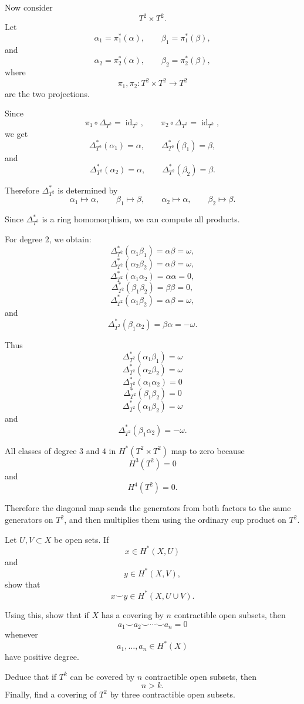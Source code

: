 \begin{solution}
Now consider
\[
T^2\times T^2.
\]
Let
\[
\alpha_1=\pi_1^*(\alpha),
\qquad
\beta_1=\pi_1^*(\beta),
\]
and
\[
\alpha_2=\pi_2^*(\alpha),
\qquad
\beta_2=\pi_2^*(\beta),
\]
where
\[
\pi_1,\pi_2:T^2\times T^2\to T^2
\]
are the two projections.

Since
\[
\pi_1\circ \Delta_{T^2}
=
\operatorname{id}_{T^2},
\qquad
\pi_2\circ \Delta_{T^2}
=
\operatorname{id}_{T^2},
\]
we get
\[
\Delta_{T^2}^*(\alpha_1)=\alpha,
\qquad
\Delta_{T^2}^*(\beta_1)=\beta,
\]
and
\[
\Delta_{T^2}^*(\alpha_2)=\alpha,
\qquad
\Delta_{T^2}^*(\beta_2)=\beta.
\]

Therefore \(\Delta_{T^2}^*\) is determined by
\[
\boxed{
	\alpha_1\mapsto \alpha,
	\qquad
	\beta_1\mapsto \beta,
	\qquad
	\alpha_2\mapsto \alpha,
	\qquad
	\beta_2\mapsto \beta.
}
\]

Since \(\Delta_{T^2}^*\) is a ring homomorphism, we can compute all products.

For degree \(2\), we obtain:
\[
\Delta_{T^2}^*(\alpha_1\beta_1)
=
\alpha\beta
=
\omega,
\]
\[
\Delta_{T^2}^*(\alpha_2\beta_2)
=
\alpha\beta
=
\omega,
\]
\[
\Delta_{T^2}^*(\alpha_1\alpha_2)
=
\alpha\alpha
=
0,
\]
\[
\Delta_{T^2}^*(\beta_1\beta_2)
=
\beta\beta
=
0,
\]
\[
\Delta_{T^2}^*(\alpha_1\beta_2)
=
\alpha\beta
=
\omega,
\]
and
\[
\Delta_{T^2}^*(\beta_1\alpha_2)
=
\beta\alpha
=
-\omega.
\]

Thus
\[
\boxed{
	\Delta_{T^2}^*(\alpha_1\beta_1)=\omega
}
\]
\[
\boxed{
	\Delta_{T^2}^*(\alpha_2\beta_2)=\omega
}
\]
\[
\boxed{
	\Delta_{T^2}^*(\alpha_1\alpha_2)=0
}
\]
\[
\boxed{
	\Delta_{T^2}^*(\beta_1\beta_2)=0
}
\]
\[
\boxed{
	\Delta_{T^2}^*(\alpha_1\beta_2)=\omega
}
\]
and
\[
\boxed{
	\Delta_{T^2}^*(\beta_1\alpha_2)=-\omega.
}
\]

All classes of degree \(3\) and \(4\) in \(H^*(T^2\times T^2)\) map to zero because
\[
H^3(T^2)=0
\]
and
\[
H^4(T^2)=0.
\]

Therefore the diagonal map sends the generators from both factors to the same generators on \(T^2\), and then multiplies them using the ordinary cup product on \(T^2\).
\end{solution}

\begin{problem}
Let \(U,V\subset X\) be open sets. If
\[
x\in H^*(X,U)
\]
and
\[
y\in H^*(X,V),
\]
show that
\[
x\smile y\in H^*(X,U\cup V).
\]

Using this, show that if \(X\) has a covering by \(n\) contractible open subsets, then
\[
a_1\smile a_2\smile \cdots \smile a_n=0
\]
whenever
\[
a_1,\dots,a_n\in H^*(X)
\]
have positive degree.

Deduce that if \(T^k\) can be covered by \(n\) contractible open subsets, then
\[
n>k.
\]
Finally, find a covering of \(T^2\) by three contractible open subsets.
\end{problem}


